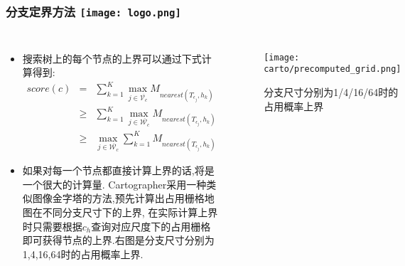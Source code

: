 \begin{comment}
\end{comment}
\begin{frame}
\frametitle{分支定界方法 \hfill \texttt{[image: logo.png]}}
\begin{columns}
	\begin{itemize}
		\item 搜索树上的每个节点的上界可以通过下式计算得到:
		\vspace{0.2cm}
		\begin{equation}
			\begin{array}{lcr}
			 score(c)  & = &  \sum_{k=1}^K \mathop{max}\limits_{j \in \overline{\mathcal{V}_c}} M_{nearest(T_{\epsilon_j}, h_k)} \\
			 & \geq &\sum_{k=1}^K \mathop{max}\limits_{j \in \overline{\mathcal{W}_c}} M_{nearest(T_{\epsilon_j}, h_k)} \\
			 &\geq& \mathop{max}\limits_{j \in \overline{\mathcal{W}_c}} \sum_{k=1}^K M_{nearest(T_{\epsilon_j}, h_k)} 
			 \end{array}
		\end{equation}
		\item 如果对每一个节点都直接计算上界的话,将是一个很大的计算量.
		Cartographer采用一种类似图像金字塔的方法,{\color{red}预先计算出占用栅格地图在不同分支尺寸下的上界},
		在实际计算上界时只需要根据$c_h$查询对应尺度下的占用栅格即可获得节点的上界.右图是分支尺寸分别为1,4,16,64时的占用概率上界.
	\end{itemize}
	\begin{figure}[h]
		\texttt{[image: carto/precomputed\_grid.png]}
		\caption{分支尺寸分别为1/4/16/64时的占用概率上界}
	\end{figure}
\end{columns}
\end{frame}

